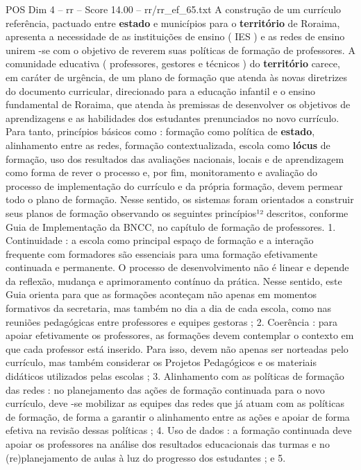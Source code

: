 \begin{textsample}{POS Dim 4 – rr – Score 14.00 – rr/rr\_ef\_65.txt}
A construção de um currículo referência, pactuado entre \textbf{estado} e municípios para o \textbf{território} de Roraima, apresenta a necessidade de as instituições de ensino ( IES ) e as redes de ensino unirem -se com o objetivo de reverem suas políticas de formação de professores.
A comunidade educativa ( professores, gestores e técnicos ) do \textbf{território} carece, em caráter de urgência, de um plano de formação que atenda às novas diretrizes do documento curricular, direcionado para a educação infantil e o ensino fundamental de Roraima, que atenda às premissas de desenvolver os objetivos de aprendizagens e as habilidades dos estudantes prenunciados no novo currículo.
Para tanto, princípios básicos como : formação como política de \textbf{estado}, alinhamento entre as redes, formação contextualizada, escola como \textbf{lócus} de formação, uso dos resultados das avaliações nacionais, locais e de aprendizagem como forma de rever o processo e, por fim, monitoramento e avaliação do processo de implementação do currículo e da própria formação, devem permear todo o plano de formação.
Nesse sentido, os sistemas foram orientados a construir seus planos de formação observando os seguintes princípios¹² descritos, conforme Guia de Implementação da BNCC, no capítulo de formação de professores. 1.
Continuidade : a escola como principal espaço de formação e a interação frequente com formadores são essenciais para uma formação efetivamente continuada e permanente.
O processo de desenvolvimento não é linear e depende da reflexão, mudança e aprimoramento contínuo da prática.
Nesse sentido, este Guia orienta para que as formações aconteçam não apenas em momentos formativos da secretaria, mas também no dia a dia de cada escola, como nas reuniões pedagógicas entre professores e equipes gestoras ; 2.
Coerência : para apoiar efetivamente os professores, as formações devem contemplar o contexto em que cada professor está inserido.
Para isso, devem não apenas ser norteadas pelo currículo, mas também considerar os Projetos Pedagógicos e os materiais didáticos utilizados pelas escolas ; 3.
Alinhamento com as políticas de formação das redes : no planejamento das ações de formação continuada para o novo currículo, deve -se mobilizar as equipes das redes que já atuam com as políticas de formação, de forma a garantir o alinhamento entre as ações e apoiar de forma efetiva na revisão dessas políticas ; 4.
Uso de dados : a formação continuada deve apoiar os professores na análise dos resultados educacionais das turmas e no (re)planejamento de aulas à luz do progresso dos estudantes ; e 5.

\end{textsample}
